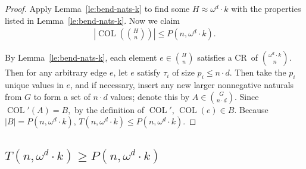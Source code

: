 \documentclass[11pt]{article}
\newcommand{\om}{\omega}
\newcommand{\oequiv}{\approx}
\newcommand{\COL}{\operatorname{COL}}
\newcommand{\crulenospace}{CR}
\newcommand{\crule}{\crulenospace~}
\newcommand{\numpoints}{n}
\newcommand{\Commonconst}{A}
\newcommand{\Rareconst}{B}
\theoremstyle{plain}
\theoremstyle{definition}
\begin{document}
\begin{proof}
Apply Lemma~\ref{le:bend-nats-k} to find some $H \oequiv \om^d \cdot k$ with the properties listed in Lemma~\ref{le:bend-nats-k}. Now we claim \begin{align*}
 \left |   \COL \left( \binom{H}{\numpoints} \right)\right | \leq 
 P(\numpoints, \om^d \cdot k).
\end{align*}

By Lemma~\ref{le:bend-nats-k}, each element $e \in \binom{H}{\numpoints}$ satisfies a \crule of $\binom{\om^d\cdot k}{\numpoints}$. 
Then for any arbitrary edge $e$, let $e$ satisfy $\tau_i$ of size $p_i \leq \numpoints \cdot d$. 
Then take the $p_i$ unique values in $e$, and if necessary, insert any new larger nonnegative naturals from 
$G$ to form a set of $\numpoints \cdot d$ values; denote this by $\Commonconst \in \binom{G}{\numpoints \cdot d}$.
Since $\COL'(\Commonconst) = \Rareconst,$ by the definition of $\COL'$, $\COL(e) \in \Rareconst$. 
Because $|\Rareconst| = P(\numpoints,\om^d \cdot k)$, $T(\numpoints,\om^d \cdot k) \leq P(\numpoints,\om^d \cdot k)$.
\end{proof}

\subsection{\texorpdfstring{$T(\numpoints,\omega^d \cdot k) \geq P(\numpoints, \om^d \cdot k)$}{T(\numpoints, omega d k) >= P(\numpoints, omega d k)}}
\end{document}

